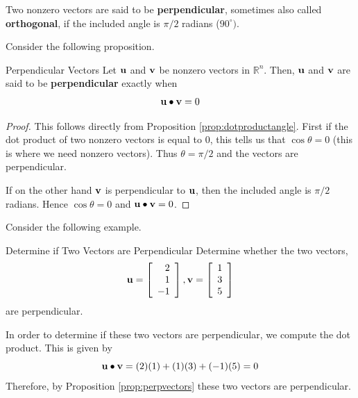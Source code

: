 Two nonzero  vectors are said to be \textbf{perpendicular},
 sometimes also called \textbf{orthogonal}, if
the included angle is $\pi /2$ radians ($90^{\circ }).$

Consider the following proposition.

\begin{proposition}{Perpendicular Vectors}\label{prop:perpvectors}
Let $\mathbf{u}$ and $\mathbf{v}$ be nonzero vectors in $\mathbb{R}^n$. Then, 
$\mathbf{u}$ and $\mathbf{v}$ are said to be \textbf{perpendicular}  exactly when
\begin{equation*}
\mathbf{u}
\bullet
\mathbf{v}
=
0
\end{equation*}
\end{proposition}

\ifdefined\showproofs
\begin{proof}
This follows directly from Proposition \ref{prop:dotproductangle}. First if the dot product of
two nonzero vectors is equal to $0$, this tells us that $\cos \theta
=0$ (this is where we need nonzero vectors). Thus $\theta = \pi /2$
and the vectors are perpendicular.

If on the other hand $\mathbf{v}$ is perpendicular to $\mathbf{u}$, then 
the included angle is $\pi /2$ radians. Hence $\cos \theta =0$ and 
$\mathbf{u} \bullet \mathbf{v} = 0$.
\end{proof}
\fi
Consider the following example.

\begin{example}{Determine if Two Vectors are Perpendicular}\label{exa:perpendicularvectors}
Determine whether the two vectors, 
\begin{equation*}
\mathbf{u}=
\left[
\begin{array}{r}
2 \\
1 \\
-1 
\end{array}
\right], 
\mathbf{v} 
=
\left[
\begin{array}{r}
1 \\
3 \\
5
\end{array}
\right]
\end{equation*}
 are perpendicular.
\end{example}

\begin{solution}
In order to determine if these two vectors are perpendicular, we compute the dot product.
This is given by
\begin{equation*}
\mathbf{u} \bullet \mathbf{v}
=
(2)(1) + (1)(3) + (-1)(5)
=
0
\end{equation*}
Therefore, by Proposition \ref{prop:perpvectors} these two vectors are perpendicular.
\end{solution}